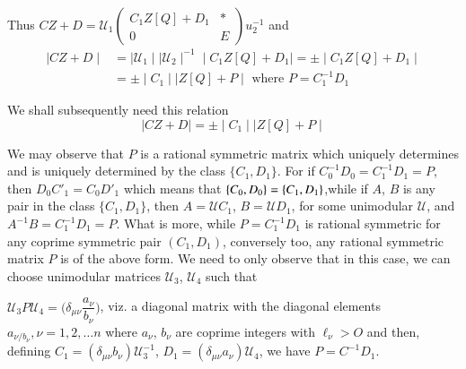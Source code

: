 Thus $ CZ + D  = \mathcal{U}_1
 \begin{pmatrix}
 C_1 Z [ Q ] +D_1 & * \\
 0  & E 
 \end{pmatrix} u^{-1}_2  $
 \hfill{ and  } 
\begin{align*}
\mid CZ + D \mid &= \mid \mathcal{U}_1 \mid  \mid \mathcal{U}_2
\mid^{-1} \mid C_1 Z[ Q ] + D_1 \mid   = \pm \mid C_1 Z [ Q ] + D_1
\mid \\ 
&= \pm \mid C_1 \mid  \mid Z[ Q ] + P \mid          \text{ where }  P
= C_1^{-1} D_1 
\end{align*}

We shall subsequently need this relation 
\begin{equation*}
 \mid C Z + D \mid = \pm \mid C_1 \mid \big| Z [ Q ] + P \mid
 \tag{69}\label{eq69} 
\end{equation*}

We may observe that $P$ is a rational symmetric matrix which uni\-quely
determines and is uniquely determined by the class $ \{ C_1, D_1\}$. 
For  if $ C^{-1}_0 D_0 = C^{-1}_1 D_1 = P $, then $ D_0 C'_1 = C_0
D'_1 $ which means that  
$\{ C_0, D_0 \}\break = \{C_1, D_1\}$,\pageoriginale while if $A$, $B$ is
any pair in the 
class $\{C_1, D_1\}$, then $A = \mathcal{U} C_1$, $B = \mathcal{U}D_1$,
for some unimodular $\mathcal{U}$, and $A^{-1}B = C^{-1}_1
D_1=P$. What is more, while $P = C^{-1}_1 D_1$ is rational symmetric
for any coprime symmetric pair $(C_1, D_1)$, conversely too, any
rational symmetric matrix $P$ is of the above form. We need to only
observe that in this case, we can choose unimodular matrices
$\mathcal{U}_3$, $\mathcal{U}_4$ such that 

$\mathcal{U}_3 P \mathcal{U}_4 =\bigg(\delta_{\mu
  \nu}\dfrac{a_\nu}{b_\nu}\bigg) $, viz. a diagonal matrix with the 
diagonal elements $a_{\nu / b_\nu}, \nu =1, 2, \ldots n$ where
$a_\nu$, $b_\nu$ are coprime integers with $\ell_\nu > O$ and then,
defining $C_1 = (\delta_{\mu \nu}b_\nu) \mathcal{U}^{-1}_{3}$, $D_1 =
(\delta_{\mu \nu}a_\nu) \mathcal{U}_4$, we have $P = C^{-1}D_1$. 

